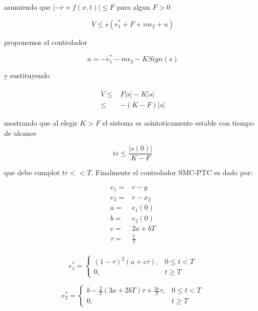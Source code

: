 asumiendo que $|-\ddot{r}+f(x,t)|\leq F$ para algun $F>0$

\begin{equation*}
    \dot{V} \leq s(\ddot{e}_1^*+F+m\epsilon_2+u)
\end{equation*}

proponemos el controlador

\begin{equation*}
    u=-\ddot{e}_1^*-m\epsilon_2-K Sign(s)
\end{equation*}

y sustituyendo

\begin{equation*}
    \begin{aligned}
        \dot{V}\leq& F|s|-K|s|\\
            \leq & -(K-F)|s|
    \end{aligned}
\end{equation*}

mostrando que al elegir $K>F$ el sistema es asintoticamente estable con tiempo de alcance

\begin{equation*}
    tr \leq \frac{|s(0)|}{K-F}
\end{equation*}

que debe cumplot $tr << T$. Finalmente el controlador SMC-PTC es dado por:

\begin{equation*}
    \begin{aligned}
        e_1=&r-y\\
        e_2=&\dot{r}-x_2\\
        a=& e_1(0)\\
        b=& e_2(0)\\
        c=& 2a+bT\\
        \tau = & \frac{t}{T}\\
    \end{aligned}
\end{equation*}

\begin{equation*}
    e_1^* = \begin{cases}
			(1-\tau)^2(a+c\tau), & 0 \leq t < T\\
            0, & t \geq T
		 \end{cases}
\end{equation*}

\begin{equation*}
    e_2^* = \begin{cases}
			b-\frac{2}{T}(3a+2bT)\tau+\frac{3c}{T}\tau, & 0 \leq t < T\\
            0, & t \geq T
		 \end{cases}
\end{equation*}

